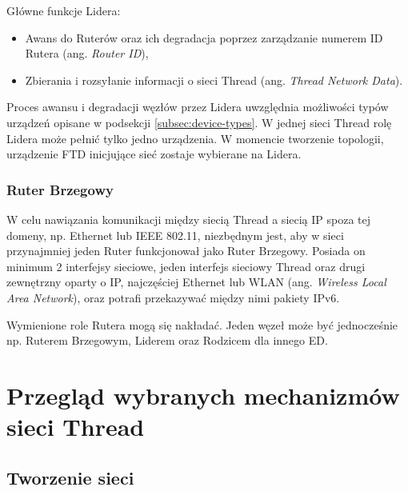        Główne funkcje Lidera:
        \begin{itemize}
            \item Awans do Ruterów oraz ich degradacja poprzez zarządzanie numerem ID Rutera (ang. \textit{Router ID}),
            \item Zbierania i rozsyłanie informacji o sieci Thread (ang. \textit{Thread Network Data}).
        \end{itemize}

        Proces awansu i degradacji węzłów przez Lidera uwzględnia możliwości typów urządzeń opisane w podsekcji \ref{subsec:device-types}. W jednej sieci Thread rolę Lidera może pełnić tylko jedno urządzenia. W momencie tworzenie topologii, urządzenie FTD inicjujące sieć zostaje wybierane na Lidera.
        
        \subsubsection{Ruter Brzegowy}

        W celu nawiązania komunikacji między siecią Thread a siecią IP spoza tej domeny, np. Ethernet lub IEEE 802.11, niezbędnym jest, aby w sieci przynajmniej jeden Ruter funkcjonował jako Ruter Brzegowy. Posiada on minimum 2 interfejsy sieciowe, jeden interfejs sieciowy Thread oraz drugi zewnętrzny oparty o IP, najczęściej Ethernet lub WLAN (ang. \textit{Wireless Local Area Network}), oraz potrafi przekazywać między nimi pakiety IPv6.

    Wymienione role Rutera mogą się nakładać. Jeden węzeł może być jednocześnie np. Ruterem Brzegowym, Liderem oraz Rodzicem dla innego ED.

\section{Przegląd wybranych mechanizmów sieci Thread}

    \subsection{Tworzenie sieci}
    \label{subsec:network-forming}

